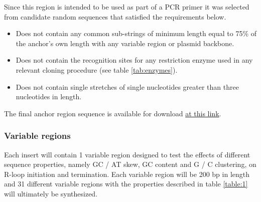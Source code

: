 \documentclass[11pt]{article}
\begin{document}
Since this region is intended to be used as part of a PCR primer it was selected from candidate random sequences that satisfied the requirements below.

\begin{itemize}
	\item Does not contain any common sub-strings of minimum length equal to 75\% of the anchor's own length with any variable region or plasmid backbone.
	\item Does not contain the recognition sites for any restriction enzyme used in any relevant cloning procedure (see table \ref{tab:enzymes}).
	\item Does not contain single stretches of single nucleotides greater than three nucleotides in length.
\end{itemize}

The final anchor region sequence is available for download \href{}{at this link}.

\subsubsection{Variable regions}

Each insert will contain 1 variable region designed to test the effects of different sequence properties, namely GC / AT skew, GC content and G / C clustering, on R-loop initiation and termination. Each variable region will be 200 bp in length and 31 different variable regions with the properties described in table \ref{table:1} will ultimately be synthesized. 
\end{document}

